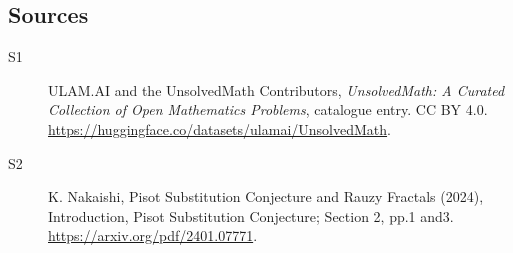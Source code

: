 \documentclass[11pt]{article}
\begin{document}
\subsection{Sources}
\begin{description}
\item[\hypertarget{source:statement:1}{S1}] ULAM.AI and the UnsolvedMath Contributors, \emph{UnsolvedMath: A Curated Collection of Open Mathematics Problems}, catalogue entry. CC BY 4.0. \url{https://huggingface.co/datasets/ulamai/UnsolvedMath}.
\item[\hypertarget{source:statement:2}{S2}] K. Nakaishi, Pisot Substitution Conjecture and Rauzy Fractals (2024), Introduction, Pisot Substitution Conjecture; Section 2, pp.1 and3. \url{https://arxiv.org/pdf/2401.07771}.
\end{description}
\label{end:statement}
\end{document}
